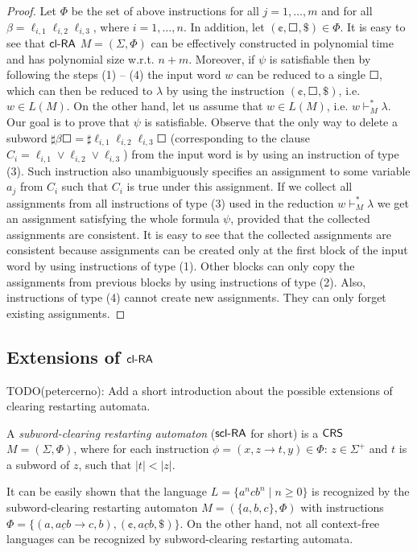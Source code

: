 \begin{proof}
Let $\Phi$ be the set of above instructions for all $j = 1, \ldots, m$ and for all $\beta = \ell_{i,1} \ell_{i,2} \ell_{i,3}$, where $i = 1, \ldots, n$. In addition, let $(\cent, \Square, \$) \in \Phi$. It is easy to see that $\mbox{\sf cl-RA\/}$ $M = (\Sigma, \Phi)$ can be effectively constructed in polynomial time and has polynomial size w.r.t. $n + m$. Moreover, if $\psi$ is satisfiable then by following the steps (1) -- (4) the input word $w$ can be reduced to a single $\Square$, which can then be reduced to $\lambda$ by using the instruction $(\cent, \Square, \$)$, i.e. $w \in L(M)$. On the other hand, let us assume that $w \in L(M)$, i.e. $w \vdash_M^* \lambda$. Our goal is to prove that $\psi$ is satisfiable. Observe that the only way to delete a subword $\sharp \beta \Square = \sharp \ell_{i,1} \ell_{i,2} \ell_{i,3} \Square$ (corresponding to the clause $C_i = \ell_{i,1} \vee \ell_{i,2} \vee \ell_{i,3}$) from the input word is by using an instruction of type (3). Such instruction also unambiguously specifies an assignment to some variable $a_j$ from $C_i$ such that $C_i$ is true under this assignment. If we collect all assignments from all instructions of type (3) used in the reduction $w \vdash_M^* \lambda$ we get an assignment satisfying the whole formula $\psi$, provided that the collected assignments are consistent. It is easy to see that the collected assignments are consistent because assignments can be created only at the first block of the input word by using instructions of type (1). Other blocks can only copy the assignments from previous blocks by using instructions of type (2). Also, instructions of type (4) cannot create new assignments. They can only forget existing assignments.
\end{proof}

\subsection{Extensions of $\mbox{\sf cl-RA\/}$}\label{clra_extensions}

TODO(petercerno): Add a short introduction about the possible extensions of clearing restarting automata.

A \emph{subword-clearing restarting automaton} (\emph{$\mbox{\sf scl-RA}$} for short) is a $\mbox{\sf CRS\/}$ $M = (\Sigma, \Phi)$, where for each instruction  $\phi = (x, z \to t, y) \in \Phi$: $z \in \Sigma^+$ and $t$ is a subword of $z$, such that $|t| < |z|$.

It can be easily shown that the language $L = \{a^n c b^n \mid n \ge 0\}$  is recognized by the subword-clearing restarting automaton $M = (\{a, b, c\}, \Phi)$ with instructions $\Phi = \{(a, \underline{acb} \to c, b), (\cent, \underline{acb}, \$)\}$. On the other hand, not all context-free languages can be recognized by subword-clearing restarting automata. 

